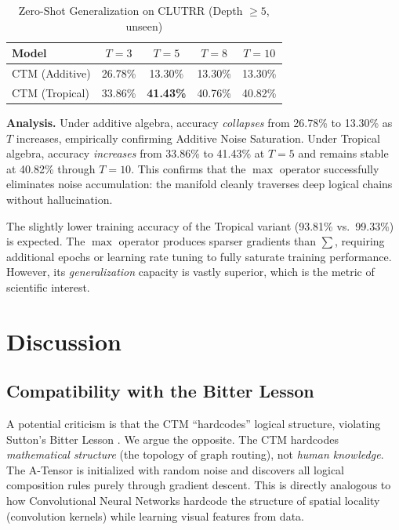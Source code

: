 \documentclass[11pt,a4paper]{article}
\begin{document}
\begin{table}[h]
\centering
\caption{Zero-Shot Generalization on CLUTRR (Depth $\geq 5$, unseen)}
\begin{tabular}{lcccc}
\toprule
\textbf{Model} & $T{=}3$ & $T{=}5$ & $T{=}8$ & $T{=}10$ \\
\midrule
CTM (Additive) & 26.78\% & 13.30\% & 13.30\% & 13.30\% \\
CTM (Tropical) & 33.86\% & \textbf{41.43\%} & 40.76\% & 40.82\% \\
\bottomrule
\end{tabular}
\end{table}

\textbf{Analysis.} Under additive algebra, accuracy \textit{collapses} from 26.78\% to 13.30\% as $T$ increases, empirically confirming Additive Noise Saturation. Under Tropical algebra, accuracy \textit{increases} from 33.86\% to 41.43\% at $T{=}5$ and remains stable at 40.82\% through $T{=}10$. This confirms that the $\max$ operator successfully eliminates noise accumulation: the manifold cleanly traverses deep logical chains without hallucination.

The slightly lower training accuracy of the Tropical variant (93.81\% vs.\ 99.33\%) is expected. The $\max$ operator produces sparser gradients than $\sum$, requiring additional epochs or learning rate tuning to fully saturate training performance. However, its \textit{generalization} capacity is vastly superior, which is the metric of scientific interest.

\section{Discussion}

\subsection{Compatibility with the Bitter Lesson}
A potential criticism is that the CTM ``hardcodes'' logical structure, violating Sutton's Bitter Lesson \cite{sutton2019bitter}. We argue the opposite. The CTM hardcodes \textit{mathematical structure} (the topology of graph routing), not \textit{human knowledge}. The A-Tensor is initialized with random noise and discovers all logical composition rules purely through gradient descent. This is directly analogous to how Convolutional Neural Networks hardcode the structure of spatial locality (convolution kernels) while learning visual features from data.
\end{document}
